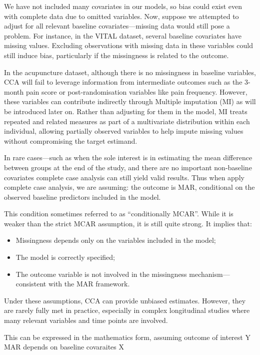 \documentclass{article}
\providecommand{\tightlist}{%
  \setlength{\itemsep}{0pt}\setlength{\parskip}{0pt}}
\begin{document}
We have not included many covariates in our models, so bias could exist
even with complete data due to omitted variables. Now, suppose we
attempted to adjust for all relevant baseline covariates---missing data
would still pose a problem. For instance, in the VITAL dataset, several
baseline covariates have missing values. Excluding observations with
missing data in these variables could still induce bias, particularly if
the missingness is related to the outcome.

In the acupuncture dataset, although there is no missingness in baseline
variables, CCA will fail to leverage information from intermediate
outcomes such as the 3-month pain score or post-randomisation variables
like pain frequency. However, these variables can contribute indirectly
through Multiple imputation (MI) as will be introduced later on. Rather
than adjusting for them in the model, MI treats repeated and related
measures as part of a multivariate distribution within each individual,
allowing partially observed variables to help impute missing values
without compromising the target estimand.

In rare cases---such as when the sole interest is in estimating the mean
difference between groups at the end of the study, and there are no
important non-baseline covariates complete case analysis can still yield
valid results. Thus when apply complete case analysis, we are assuming:
the outcome is MAR, conditional on the observed baseline predictors
included in the model.

This condition sometimes referred to as ``conditionally MCAR''. While it
is weaker than the strict MCAR assumption, it is still quite strong. It
implies that:

\begin{itemize}
\tightlist
\item
  Missingness depends only on the variables included in the model;
\item
  The model is correctly specified;
\item
  The outcome variable is not involved in the missingness
  mechanism---consistent with the MAR framework.
\end{itemize}

Under these assumptions, CCA can provide unbiased estimates. However,
they are rarely fully met in practice, especially in complex
longitudinal studies where many relevant variables and time points are
involved.

This can be expressed in the mathematics form, assuming outcome of
interest Y MAR depends on baseline covaraites X
\end{document}

